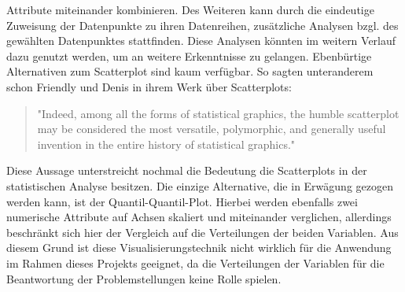 \documentclass[usegeometry=true]{scrartcl}
\begin{document}
Attribute miteinander kombinieren.
Des Weiteren kann durch die eindeutige Zuweisung der Datenpunkte zu ihren Datenreihen, zusätzliche Analysen bzgl.
des gewählten Datenpunktes stattfinden. Diese Analysen könnten im weitern Verlauf dazu genutzt werden, um an weitere Erkenntnisse zu gelangen.
\noindent Ebenbürtige Alternativen zum Scatterplot sind kaum verfügbar. So sagten unteranderem schon Friendly und Denis in ihrem Werk über Scatterplots:
\begin{quote}"Indeed, among all the forms of statistical
	graphics, the humble scatterplot may be considered
	the most versatile, polymorphic, and generally useful invention in the entire history of statistical graphics."\cite[103]{Friendly2005}
\end{quote}

Diese Aussage unterstreicht nochmal die Bedeutung die Scatterplots in der statistischen Analyse besitzen.
Die einzige Alternative, die in Erwägung gezogen werden kann, ist der Quantil-Quantil-Plot. Hierbei werden ebenfalls zwei numerische Attribute auf Achsen skaliert und
miteinander verglichen, allerdings beschränkt sich hier der Vergleich auf die Verteilungen der beiden Variablen. Aus diesem Grund ist diese Visualisierungstechnik nicht wirklich
für die Anwendung im Rahmen dieses Projekts geeignet, da die Verteilungen der Variablen für die Beantwortung der Problemstellungen keine Rolle spielen.
\end{document}
